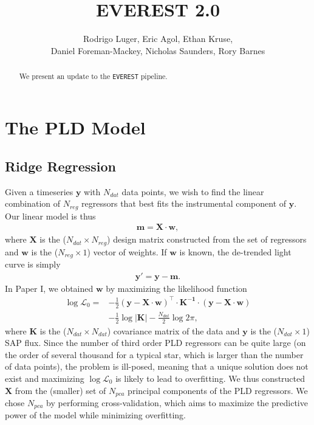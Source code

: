 \documentclass[]{emulateapj}
\begin{document}
\title{EVEREST 2.0}
\author{Rodrigo Luger, Eric Agol, Ethan Kruse, \\
Daniel Foreman-Mackey, Nicholas Saunders, Rory Barnes}

\begin{abstract}
We present an update to the \texttt{EVEREST} pipeline.
\end{abstract}

\section{The PLD Model}
\label{sec:model}

\subsection{Ridge Regression}
\label{sec:ridge}
Given a timeseries $\mathbf{y}$ with $N_{dat}$ data points, we wish to find the linear
combination of $N_{reg}$ regressors that best fits the instrumental component of $\mathbf{y}$.
Our linear model is thus
%
\begin{align}
\label{eq:xdotw}
\mathbf{m} = \mathbf{X} \cdot \mathbf{w},
\end{align}
%
where $\mathbf{X}$ is the ($N_{dat} \times N_{reg}$) design matrix constructed from the set
of regressors and $\mathbf{w}$ is the ($N_{reg} \times 1$) vector of weights. If 
$\mathbf{w}$ is known, the de-trended light curve is simply
%
\begin{align}
\label{eq:detrended}
\mathbf{y}' = \mathbf{y} - \mathbf{m}.
\end{align}
%
In Paper I, we obtained $\mathbf{w}$ by maximizing the likelihood function
%
\begin{align}
\label{eq:like0}
\log\mathcal{L}_0 =  &-\frac{1}{2} \left(\mathbf{y} - \mathbf{X} \cdot \mathbf{w}\right)^\top
                     \cdot
                     \mathbf{K^{-1}}
                     \cdot
                     \left(\mathbf{y} - \mathbf{X} \cdot \mathbf{w}\right) \nonumber\\  
                     &-\frac{1}{2} \log\left|\mathbf{K}\right| 
                     -\frac{N_{dat}}{2}\log 2\pi,
\end{align}
%
where $\mathbf{K}$ is the ($N_{dat} \times N_{dat}$) covariance matrix of the data and
$\mathbf{y}$ is the ($N_{dat} \times 1$) SAP flux. Since the number of third order PLD regressors can
be quite large (on the order of several thousand for a typical star, which is larger than the number
of data points), the problem is ill-posed, meaning that a unique solution does not exist and 
maximizing $\log\mathcal{L}_0$ is likely to lead to overfitting. We thus constructed $\mathbf{X}$
from the (smaller) set of $N_{pca}$ principal components of the PLD regressors. We chose $N_{pca}$
by performing cross-validation, which aims to maximize the predictive power of the model while
minimizing overfitting.
\end{document}
